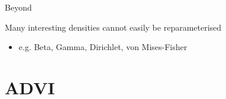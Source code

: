 \documentclass[14pt,dvipsnames]{beamer}
\begin{document}
\begin{comment}
\begin{frame}{Standardisation functions (cont.)}
	Inverse cdf
	\begin{itemize}
		\item for univariate $Z$ with pdf $f_Z(z)$ and cdf $F_Z(z)$
		\begin{equation*}
		\begin{aligned}
			P \sim \mathcal U(0, 1) \qquad Z \sim \inv{F}_Z(P) 
		\end{aligned}		
		\end{equation*}
		where $\inv{F}_Z(p)$ is the \emph{quantile function}
	\end{itemize}
	
	~ \pause
	
	Gumbel distribution
	\begin{itemize}
		\item $f_Z(z|\mu, \beta) = \beta^{-1}\exp(-z -\exp(-z))$ 
		\item $F_Z(z|\mu, \beta) = \exp(-\exp(-\frac{z-\mu}{\beta}))$
		\item $\inv{F}_Z(p) = \mu - \beta \log( - \log p)$
	\end{itemize}
\end{frame}
\end{comment}

\begin{frame}{Beyond}

	Many interesting densities cannot easily be reparameterised %
	\begin{itemize}
		\item e.g. Beta, Gamma, Dirichlet, von Mises-Fisher
	\end{itemize} 

\end{frame}

\section{ADVI}
\end{document}
